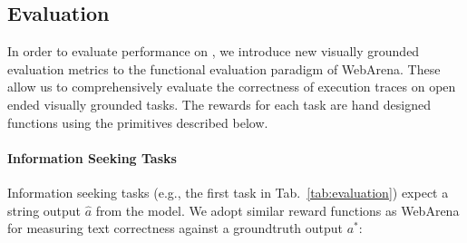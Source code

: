 \subsection{Evaluation}   \label{sec:environment_evaluation}

In order to evaluate performance on \BenchmarkName{}, we introduce new visually grounded evaluation metrics to the functional evaluation paradigm of WebArena. These allow us to comprehensively evaluate the correctness of execution traces on open ended visually grounded tasks. The rewards for each task are hand designed functions using the primitives described below.

\paragraph{Information Seeking Tasks}
Information seeking tasks (e.g., the first task in Tab.~\ref{tab:evaluation}) expect a string output $\hat{a}$ from the model. We adopt similar reward functions as WebArena for measuring text correctness against a groundtruth output $a^*$:
